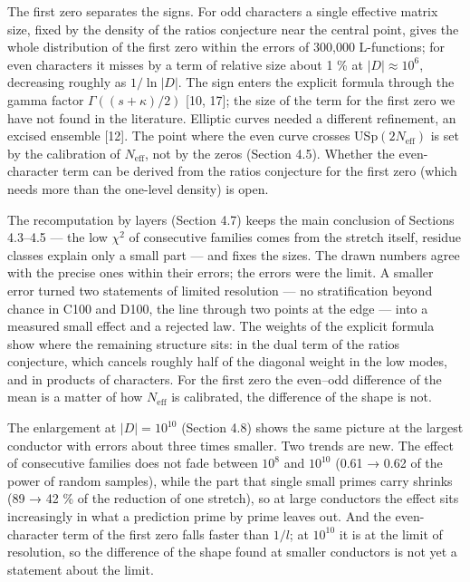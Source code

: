\documentclass[
  10pt,
]{article}
\begin{document}
The first zero separates the signs. For odd characters a single
effective matrix size, fixed by the density of the ratios conjecture
near the central point, gives the whole distribution of the first zero
within the errors of 300,000 L-functions; for even characters it misses
by a term of relative size about 1 \% at \(|D| \approx 10^6\),
decreasing roughly as \(1/\ln|D|\). The sign enters the explicit formula
through the gamma factor \(\Gamma((s + \kappa)/2)\) {[}10, 17{]}; the
size of the term for the first zero we have not found in the literature.
Elliptic curves needed a different refinement, an excised ensemble
{[}12{]}. The point where the even curve crosses
USp\((2N_{\mathrm{eff}})\) is set by the calibration of
\(N_{\mathrm{eff}}\), not by the zeros (Section 4.5). Whether the
even-character term can be derived from the ratios conjecture for the
first zero (which needs more than the one-level density) is open.

The recomputation by layers (Section 4.7) keeps the main conclusion of
Sections 4.3--4.5 --- the low \(\chi^2\) of consecutive families comes
from the stretch itself, residue classes explain only a small part ---
and fixes the sizes. The drawn numbers agree with the precise ones
within their errors; the errors were the limit. A smaller error turned
two statements of limited resolution --- no stratification beyond chance
in C100 and D100, the line through two points at the edge --- into a
measured small effect and a rejected law. The weights of the explicit
formula show where the remaining structure sits: in the dual term of the
ratios conjecture, which cancels roughly half of the diagonal weight in
the low modes, and in products of characters. For the first zero the
even--odd difference of the mean is a matter of how \(N_{\mathrm{eff}}\)
is calibrated, the difference of the shape is not.

The enlargement at \(|D| = 10^{10}\) (Section 4.8) shows the same
picture at the largest conductor with errors about three times smaller.
Two trends are new. The effect of consecutive families does not fade
between \(10^8\) and \(10^{10}\) (0.61 → 0.62 of the power of random
samples), while the part that single small primes carry shrinks (89 → 42
\% of the reduction of one stretch), so at large conductors the effect
sits increasingly in what a prediction prime by prime leaves out. And
the even-character term of the first zero falls faster than \(1/l\); at
\(10^{10}\) it is at the limit of resolution, so the difference of the
shape found at smaller conductors is not yet a statement about the
limit.
\end{document}
